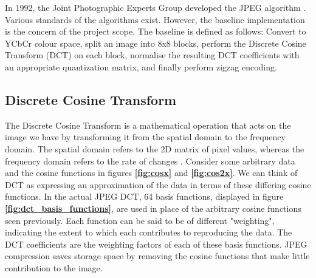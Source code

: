 \documentclass{l4proj}
\begin{document}
In 1992, the Joint Photographic Experts Group developed the JPEG algorithm \citep{lossy_data_compression:_jpeg_2021}. Various standards of the algorithms exist. However, the baseline implementation is the concern of the project scope. The baseline is defined as follows: Convert to YCbCr colour space, split an image into 8x8 blocks, perform the Discrete Cosine Transform (DCT) on each block, normalise the resulting DCT coefficients with an appropriate quantization matrix, and finally perform zigzag encoding.

\subsection{Discrete Cosine Transform}

The Discrete Cosine Transform \citep{the_discrete_cosine_transform_(dct)_2021} is a mathematical operation that acts on the image we have by transforming it from the spatial domain to the frequency domain. The spatial domain refers to the 2D matrix of pixel values, whereas the frequency domain refers to the rate of changes \citep{spatial}. Consider some arbitrary data and the cosine functions in figures \textbf{\ref{fig:cosx}} and \textbf{\ref{fig:cos2x}}. We can think of DCT as expressing an approximation of the data in terms of these differing cosine functions. In the actual JPEG DCT, 64 basis functions, displayed in figure \textbf{\ref{fig:dct_basis_functions}}, are used in place of the arbitrary cosine functions seen previously. Each function can be said to be of different "weighting", indicating the extent to which each contributes to reproducing the data. The DCT coefficients are the weighting factors of each of these basis functions. JPEG compression saves storage space by removing the cosine functions that make little contribution to the image.
\end{document}
